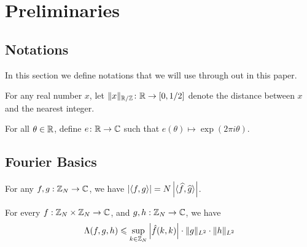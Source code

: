 \section{Preliminaries}
\subsection{Notations}
In this section we define notations that we will use through out in this paper. 

\noindent For any real number $ x $, let $ \| x \|_{{\mathbb R} /{\mathbb Z}}\colon {\mathbb R} \rightarrow [0,1/2] $ denote the distance between $ x $ and the nearest integer. 

\noindent For all $ \theta \in {\mathbb R}$, define $ e\colon {\mathbb R} \to {\mathbb C}$ such that $e(\theta) \mapsto \exp(2\pi i \theta)$.

\subsection{Fourier Basics}

\begin{lemma}
	For any $ f, g : {\mathbb Z}_N \rightarrow {\mathbb C} $, we have $ \left\vert{\langle f, g \rangle}\right\vert = N \left\vert{\langle \widehat{f}, \widehat{g} \rangle}\right\vert $.
\end{lemma}

\begin{lemma} \label{L2-ineq}
	For every $ f : {\mathbb Z}_N \times {\mathbb Z}_N \rightarrow {\mathbb C} $, and $ g, h : {\mathbb Z}_N \rightarrow {\mathbb C} $, we have
	$$ \Lambda(f,g,h) \leqslant \sup_{k \in {\mathbb Z}_N} \left\vert{\hat{f}(k,k)}\right\vert \cdot \|g \|_{L^2} \cdot \|h\|_{L^2} $$
\end{lemma}

